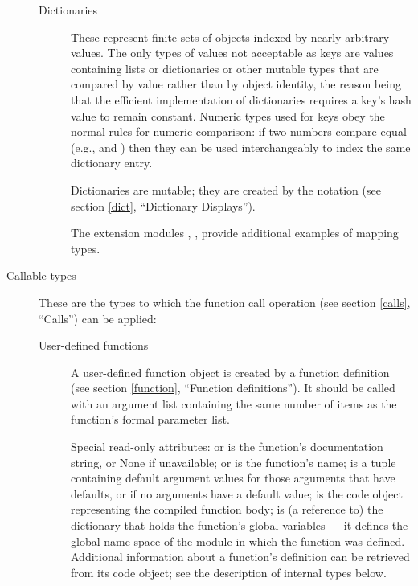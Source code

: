 \begin{description}
\begin{description}
\item[Dictionaries]
These represent finite sets of objects indexed by nearly arbitrary
values.  The only types of values not acceptable as keys are values
containing lists or dictionaries or other mutable types that are
compared by value rather than by object identity, the reason being
that the efficient implementation of dictionaries requires a key's
hash value to remain constant.
Numeric types used for keys obey the normal rules for numeric
comparison: if two numbers compare equal (e.g.,  and
) then they can be used interchangeably to index the same
dictionary entry.

Dictionaries are mutable; they are created by the 
notation (see section \ref{dict}, ``Dictionary Displays'').

The extension modules ,
, 
provide additional examples of mapping types.

\end{description} %

\item[Callable types]
These are the types to which the function call operation (see section
\ref{calls}, ``Calls'') can be applied:

\begin{description}

\item[User-defined functions]
A user-defined function object is created by a function definition
(see section \ref{function}, ``Function definitions'').  It should be
called with an argument
list containing the same number of items as the function's formal
parameter list.

Special read-only attributes:  or  is the
function's documentation string, or None if unavailable;
 or  is the function's name;
 is a tuple containing default argument values for
those arguments that have defaults, or  if no arguments
have a default value;  is the code object representing
the compiled function body;  is (a reference to)
the dictionary that holds the function's global variables --- it
defines the global name space of the module in which the function was
defined.  Additional information about a function's definition can be
retrieved from its code object; see the description of internal types
below.


\end{description}
\end{description}
